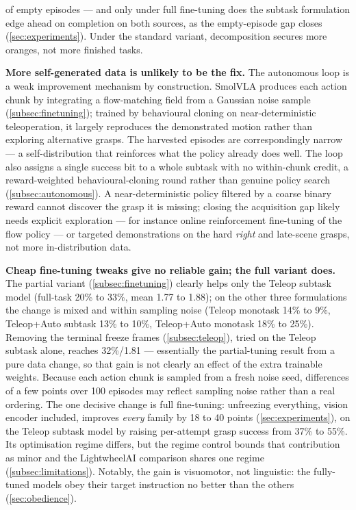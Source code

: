 of empty episodes --- and only under full fine-tuning does the subtask formulation edge ahead on completion on both sources, as the empty-episode gap closes (\cref{sec:experiments}). Under the standard variant, decomposition secures more oranges, not more finished tasks.

\textbf{More self-generated data is unlikely to be the fix.} The autonomous loop is a weak improvement mechanism by construction. SmolVLA produces each action chunk by integrating a flow-matching field from a Gaussian noise sample (\cref{subsec:finetuning}); trained by behavioural cloning on near-deterministic teleoperation, it largely reproduces the demonstrated motion rather than exploring alternative grasps. The harvested episodes are correspondingly narrow --- a self-distribution that reinforces what the policy already does well. The loop also assigns a single success bit to a whole subtask with no within-chunk credit, a reward-weighted behavioural-cloning round rather than genuine policy search (\cref{subsec:autonomous}). A near-deterministic policy filtered by a coarse binary reward cannot discover the grasp it is missing; closing the acquisition gap likely needs explicit exploration --- for instance online reinforcement fine-tuning of the flow policy --- or targeted demonstrations on the hard \emph{right} and late-scene grasps, not more in-distribution data.

\textbf{Cheap fine-tuning tweaks give no reliable gain; the full variant does.} The partial variant (\cref{subsec:finetuning}) clearly helps only the Teleop subtask model (full-task 20\% to 33\%, mean 1.77 to 1.88); on the other three formulations the change is mixed and within sampling noise (Teleop monotask 14\% to 9\%, Teleop+Auto subtask 13\% to 10\%, Teleop+Auto monotask 18\% to 25\%). Removing the terminal freeze frames (\cref{subsec:teleop}), tried on the Teleop subtask alone, reaches 32\%/1.81 --- essentially the partial-tuning result from a pure data change, so that gain is not clearly an effect of the extra trainable weights. Because each action chunk is sampled from a fresh noise seed, differences of a few points over 100 episodes may reflect sampling noise rather than a real ordering. The one decisive change is full fine-tuning: unfreezing everything, vision encoder included, improves \emph{every} family by 18 to 40 points (\cref{sec:experiments}), on the Teleop subtask model by raising per-attempt grasp success from 37\% to 55\%. Its optimisation regime differs, but the regime control bounds that contribution as minor and the LightwheelAI comparison shares one regime (\cref{subsec:limitations}). Notably, the gain is visuomotor, not linguistic: the fully-tuned models obey their target instruction no better than the others (\cref{sec:obedience}).

